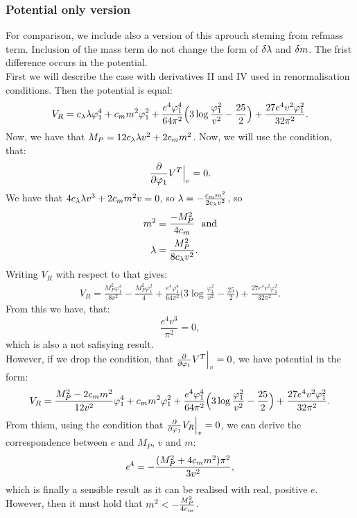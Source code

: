 \subsubsection{Potential only version}
For comparison, we include also a version of this aprouch steming from ref{mass term}.
Inclusion of the mass term do not change the
form of $\delta\lambda$ and $\delta m$. The frist difference occurs in the potential. \\
First we will describe the case with derivatives II and IV used in renormalisation conditions. 
Then the potential is equal:
\begin{align}
V_R = c_\lambda\lambda\varphi_1^4 + c_m m^2\varphi_1^2 +
\frac{e^4\varphi_1^4}{64\pi^2}\Big(3\log\frac{\varphi_1^2}{v^2}- 
\frac{25}{2}\Big)+
\frac{27e^4v^2\varphi_1^2}{32\pi^2}.
\end{align}
Now, we have that $M_P = 12c_\lambda\lambda v^2 + 2c_m m^2$. 
Now, we will use the condition, that:
\begin{align}\label{tree_first}
\frac{\partial }{\partial \varphi_1}V^T\Big|_v = 0.
\end{align}
We have that $4c_\lambda\lambda v^3+2c_m m^2v = 0$, so $\lambda = -\frac{c_m m^2}{2c_\lambda v^2}$, so 
\begin{align}
m^2&=\frac{-M_P^2}{4c_m} \textrm{\ \ and}\\ 
\lambda &= \frac{M_P^2}{8c_\lambda v^2}. 
\end{align}
Writing $V_R$ with respect to that gives:
\begin{align}
V_R = \frac{M_P^2\varphi_1^4}{8v^2}-\frac{M_P^2\varphi_1^2}{4} + 
\frac{e^4\varphi_1^4}{64\pi^2}\Big(3\log
\frac{\varphi_1^2}{v^2}- 
\frac{25}{2}\Big)+
\frac{27e^4v^2\varphi_1^2}{32\pi^2}.
\end{align}
From this we have, that:
\begin{equation}
\frac{e^4v^3}{\pi^2} = 0,
\end{equation}
which is also a not safisying result. \\
However, if we drop the condition, that 
$\frac{\partial }{\partial \varphi_1}V^T\Big|_v = 0$, we have potential in the form:
\begin{align}
V_R = \frac{M_P^2-2c_m m^2}{12v^2}\varphi_1^4+c_m m^2\varphi_1^2 + 
\frac{e^4\varphi_1^4}{64\pi^2}\Big(3\log
\frac{\varphi_1^2}{v^2}- 
\frac{25}{2}\Big)+
\frac{27e^4v^2\varphi_1^2}{32\pi^2}.
\end{align}
From thism, using the condition that $\frac{\partial }{\partial \varphi_1}V_R\Big|_v = 0$, we can derive the 
correspondence between $e$ and $M_P$, $v$ and $m$:
\begin{equation}
e^4 = -\frac{(M_P^2+4c_m m^2)\pi^2}{3v^2},
\end{equation}
which is finally a sensible result as it can be realised with real, positive $e$. However, then 
it must hold that $m^2<-\frac{M_P^2}{4c_m}$.
